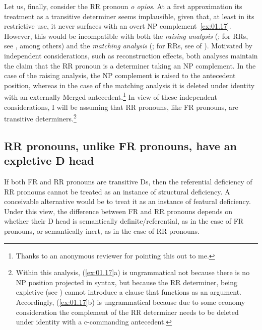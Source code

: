 \documentclass[output=paper]{langsci/langscibook}
\begin{document}
Let us, finally, consider the \gls{RR} pronoun \emph{o opios}. At a first
approximation its treatment as a transitive determiner seems implausible, given
that, at least in its restrictive use, it never surfaces with an overt NP
complement~\eqref{ex:01.17}. However, this would be incompatible with both
the \emph{raising analysis} (\citealt{Kayne1994}; for  \glspl{RR}, see
\citealt{AleAna2000}, among others) and the \emph{matching analysis}
(\citealt{Sauerland1998}; for  \glspl{RR}, see \citealt{KotzVar2005}
of ). Motivated by independent considerations, such as
reconstruction effects, both analyses maintain the claim that the \gls{RR}
pronoun is a determiner taking an NP complement. In the case of the raising
analysis, the NP complement is raised to the antecedent position, whereas in
the case of the matching analysis it is deleted under identity with an
externally Merged antecedent.\footnote{Thanks to an anonymous reviewer for
    pointing this out to me.} In view of these independent considerations, I
    will be assuming that \gls{RR} pronouns, like \gls{FR} pronouns, are
    transitive determiners.\footnote{Within this analysis,
        (\ref{ex:01.17}a) is ungrammatical not because there is no NP
        position projected in syntax, but because the \gls{RR} determiner,
        being expletive (see ) cannot introduce a clause
        that functions as an argument. Accordingly, (\ref{ex:01.17}b) is
    ungrammatical because due to some economy consideration the complement of
the \gls{RR} determiner needs to be deleted under identity with a c-commanding
antecedent.}

\subsection{RR pronouns, unlike FR pronouns, have an expletive D head}\label{sub:01.4.3}\largerpage

If both \gls{FR} and \gls{RR} pronouns are transitive Ds, then the referential
deficiency of \gls{RR} pronouns cannot be treated as an instance of structural
deficiency. A conceivable alternative would be to treat it as an instance of
featural deficiency. Under this view, the difference between \gls{FR} and
\gls{RR} pronouns depends on whether their D head is semantically
definite/referential, as in the case of \gls{FR} pronouns, or semantically
inert, as in the case of \gls{RR} pronouns.
\end{document}
